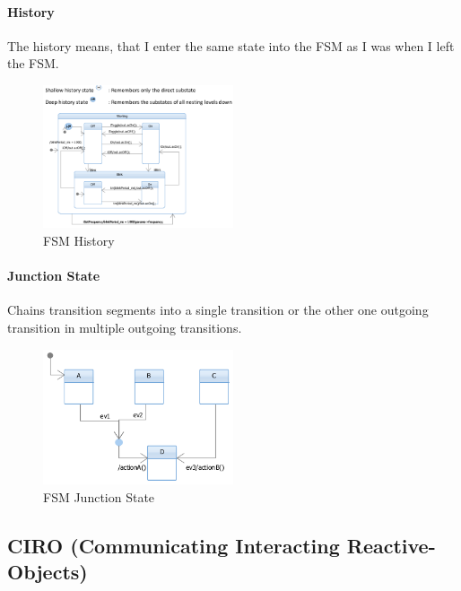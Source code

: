 \hypertarget{history}{%
\paragraph{History}\label{history}}

The history means, that I enter the same state into the FSM as I was
when I left the FSM.

\begin{figure}[H]
\centering
\includegraphics[width=0.5\textwidth]{figures/fsmHistory.png}
\caption{FSM History}
\end{figure}

\clearpage
\hypertarget{junction-state}{%
\paragraph{Junction State}\label{junction-state}}

Chains transition segments into a single transition or the other one
outgoing transition in multiple outgoing transitions.

\begin{figure}[H]
\centering
\includegraphics[width=0.5\textwidth]{figures/fsmJunctionState.png}
\caption{FSM Junction State}
\end{figure}

\subsection{CIRO (Communicating Interacting Reactive-Objects)}

